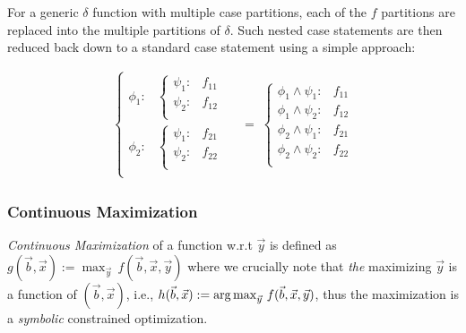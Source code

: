\documentclass[twoside,11pt]{article}
\def\argmax{\operatornamewithlimits{arg\max}}
\begin{document}
For a generic $\delta$ function with multiple case partitions, each of the $f$ partitions are replaced into the multiple partitions of $\delta$. Such nested case statements are then reduced back down to a standard case
statement using a simple approach:

\begin{align*}
    \begin{cases}
      \phi_1: & 
        \begin{cases}
          \psi_1: & f_{11} \\ 
          \psi_2: & f_{12}  \\ 
        \end{cases} \\
      \phi_2: & 
        \begin{cases}
          \psi_1: & f_{21} \\ 
          \psi_2: & f_{22}  \\ 
        \end{cases} \\
    \end{cases} & \; = \;
        \begin{cases}
          \phi_1 \land \psi_1: & f_{11} \\ 
          \phi_1 \land \psi_2: & f_{12}  \\ 
          \phi_2 \land \psi_1: & f_{21} \\ 
          \phi_2 \land \psi_2: & f_{22}  \\ 
        \end{cases} 
\end{align*}

 
\subsubsection{Continuous Maximization}
\label{contmax}
\emph{Continuous Maximization} of a function w.r.t $\vec{y}$ is defined as $g(\vec{b},\vec{x}) := \max_{\vec{y}}
\, f(\vec{b},\vec{x},\vec{y})$ where we crucially note that 
\emph{the} maximizing $\vec{y}$ is a function of $(\vec{b},\vec{x})$, i.e., $h(\vec{b},\vec{x}) := \argmax_{\vec{y}} \, f(\vec{b},\vec{x},\vec{y})$, thus the maximization is a \emph{symbolic} 
constrained optimization.
\end{document}
